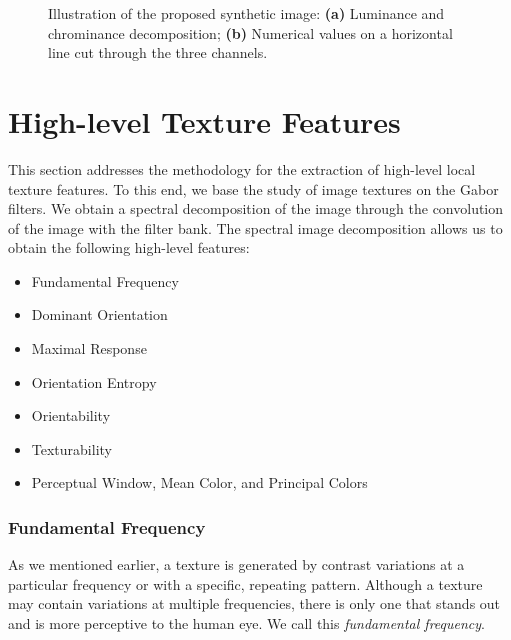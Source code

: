 \documentclass[journal]{IEEEtran}
\newcommand{\captext}[1]{\small{\textbf{\textsf{#1}}}}
\begin{document}
\begin{figure}[!ht]
\centering
\caption{Illustration of the proposed synthetic image: \captext{(a)} Luminance and chrominance decomposition; \captext{(b)} Numerical values on a horizontal line cut through the three channels.}\label{fig:three_channel_decomposition}
\end{figure}


\section{High-level Texture Features}\label{sec:high_level_features}
This section addresses the methodology for the extraction of high-level local texture features. To this end, we base the study of image textures on the Gabor filters. We obtain a spectral decomposition of the image through the convolution of the image with the filter bank. The spectral image decomposition allows us to obtain the following high-level features:

\begin{itemize}
	\item Fundamental Frequency
	\item Dominant Orientation
	\item Maximal Response
	\item Orientation Entropy
	\item Orientability
	\item Texturability 
	\item Perceptual Window, Mean Color, and Principal Colors
\end{itemize}

\subsubsection{Fundamental Frequency}
As we mentioned earlier, a texture is generated by contrast variations at a particular frequency or with a specific, repeating pattern. Although a texture may contain variations at multiple frequencies, there is only one that stands out and is more perceptive to the human eye. We call this \textit{fundamental frequency}.
\end{document}
